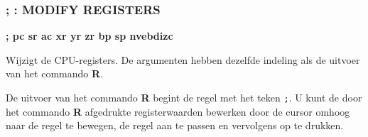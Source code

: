 \subsubsection{; : MODIFY REGISTERS}
\begin{description}[leftmargin=2cm,style=nextline]
\item [Formaat:] {\bf ; pc sr ac xr yr zr bp sp nvebdizc}\item [Gebruik:] Wijzigt de CPU-registers. De argumenten hebben dezelfde indeling als de uitvoer van het commando {\bf R}.

\item [Opmerkingen:] De uitvoer van het commando {\bf R} begint de regel met het teken {\tt ;}. U kunt de door het commando {\bf R} afgedrukte registerwaarden bewerken door de cursor omhoog naar de regel te bewegen, de regel aan te passen en vervolgens op  te drukken.

\end{description}


